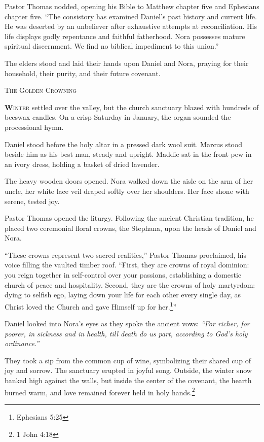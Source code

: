 \documentclass[11pt]{article}
\begin{document}
Pastor Thomas nodded, opening his Bible to Matthew chapter five and Ephesians chapter five. ``The consistory has examined Daniel's past history and current life. He was deserted by an unbeliever after exhaustive attempts at reconciliation. His life displays godly repentance and faithful fatherhood. Nora possesses mature spiritual discernment. We find no biblical impediment to this union.''

The elders stood and laid their hands upon Daniel and Nora, praying for their household, their purity, and their future covenant.

\newpage

\begin{center}
    {\scshape\large The Golden Crowning}\par
    \vspace{0.2in}
\end{center}

\lettrine[lines=3,findent=3pt,nindent=0pt]{\textbf{W}}{inter} settled over the valley, but the church sanctuary blazed with hundreds of beeswax candles. On a crisp Saturday in January, the organ sounded the processional hymn.

Daniel stood before the holy altar in a pressed dark wool suit. Marcus stood beside him as his best man, steady and upright. Maddie sat in the front pew in an ivory dress, holding a basket of dried lavender.

The heavy wooden doors opened. Nora walked down the aisle on the arm of her uncle, her white lace veil draped softly over her shoulders. Her face shone with serene, tested joy.

Pastor Thomas opened the liturgy. Following the ancient Christian tradition, he placed two ceremonial floral crowns, the Stephana, upon the heads of Daniel and Nora.

``These crowns represent two sacred realities,'' Pastor Thomas proclaimed, his voice filling the vaulted timber roof. ``First, they are crowns of royal dominion: you reign together in self-control over your passions, establishing a domestic church of peace and hospitality. Second, they are the crowns of holy martyrdom: dying to selfish ego, laying down your life for each other every single day, as Christ loved the Church and gave Himself up for her.\footnote{Ephesians 5:25}''

Daniel looked into Nora's eyes as they spoke the ancient vows: \textit{``For richer, for poorer, in sickness and in health, till death do us part, according to God's holy ordinance.''}

They took a sip from the common cup of wine, symbolizing their shared cup of joy and sorrow. The sanctuary erupted in joyful song. Outside, the winter snow banked high against the walls, but inside the center of the covenant, the hearth burned warm, and love remained forever held in holy hands.\footnote{1 John 4:18}
\end{document}
